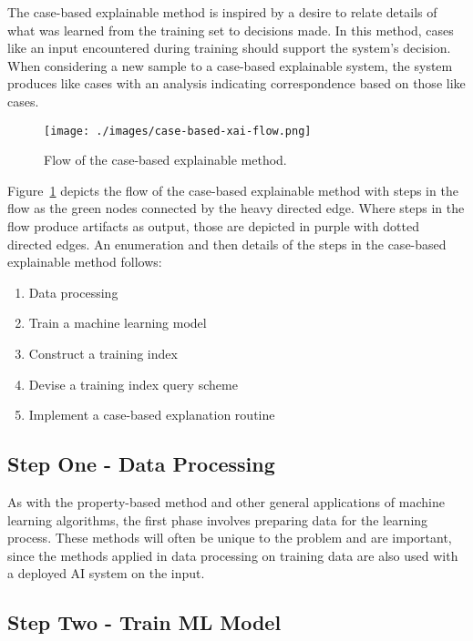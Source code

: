 The case-based explainable method is inspired by a desire to relate details of
what was learned from the training set to decisions made. In this method, cases
like an input encountered during training should support the system's decision.
When considering a new sample to a case-based explainable system, the system
produces like cases with an analysis indicating correspondence based on those
like cases.

\begin{figure}[H]
    \centering
    \texttt{[image: ./images/case-based-xai-flow.png]}
    \caption{Flow of the case-based explainable method.}
    \label{fig:case_xai_flow}
\end{figure}

Figure~\ref{fig:case_xai_flow} depicts the flow of the case-based explainable
method with steps in the flow as the green nodes connected by the heavy directed
edge. Where steps in the flow produce artifacts as output, those are depicted in
purple with dotted directed edges. An enumeration and then details of the steps
in the case-based explainable method follows:

\begin{enumerate}
    \item Data processing
    \item Train a machine learning model
    \item Construct a training index
    \item Devise a training index query scheme
    \item Implement a case-based explanation routine
\end{enumerate}

\subsection{Step One - Data Processing}

As with the property-based method and other general applications of machine
learning algorithms, the first phase involves preparing data for the learning
process. These methods will often be unique to the problem and are important,
since the methods applied in data processing on training data are also used with
a deployed AI system on the input.

\subsection{Step Two - Train ML Model}

